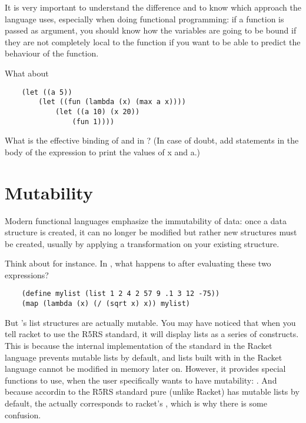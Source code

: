 \documentclass{../../../tp}
\begin{document}
It is very important to understand the difference and to know which approach the language uses, especially when doing functional programming: if a function is passed as argument, you should know how the variables are going to be bound if they are not completely local to the function if you want to be able to predict the behaviour of the function.

\begin{instruction}
	
	What about 
	
	\begin{verbatim}
	(let ((a 5)) 
		(let ((fun (lambda (x) (max a x))))
			(let ((a 10) (x 20))
				(fun 1))))
	\end{verbatim}
	
	What is the effective binding of  and  in ?
	(In case of doubt, add  statements in the body of the 
	expression to print the values of x and a.)
	
\end{instruction}


\section{Mutability}

Modern functional languages emphasize the immutability of data: once a data structure is created, it can no longer be modified but rather new structures must be created, usually by applying a transformation on your existing structure.

\begin{instruction} 
	Think about  for instance. In \scheme, what happens to  after evaluating these two expressions?
	
	\begin{verbatim}
	(define mylist (list 1 2 4 2 57 9 .1 3 12 -75))
	(map (lambda (x) (/ (sqrt x) x)) mylist)
	\end{verbatim}

\end{instruction}

But \scheme's list structures are actually mutable. You may have noticed that when you tell racket to use the R5RS standard, it will display lists as a series of  constructs. This is because the internal implementation of the \scheme standard in the Racket language prevents mutable lists by default, and lists built with  in the Racket language cannot be modified in memory later on. However, it provides special functions to use, when the user specifically wants to have mutability: . And because accordin to the R5RS standard pure \scheme (unlike Racket) has mutable lists by default, the \scheme {} actually corresponds to racket's , which is why there is some confusion.
\end{document}
